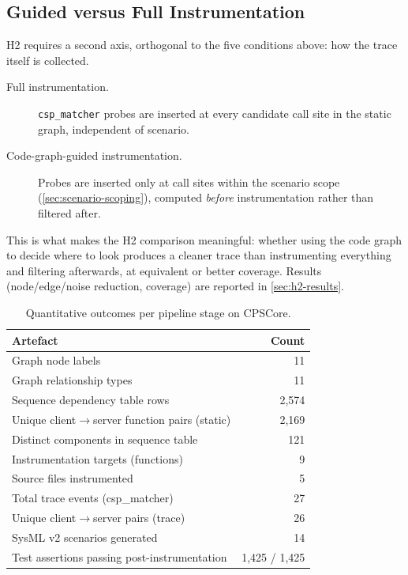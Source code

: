 \subsection{Guided versus Full Instrumentation}\label{sec:guided-vs-full}

H2 requires a second axis, orthogonal to the five conditions above: how
the trace itself is collected.

\begin{description}
  \item[Full instrumentation.] \texttt{csp\_matcher} probes are inserted
    at every candidate call site in the static graph, independent of
    scenario.
  \item[Code-graph-guided instrumentation.] Probes are inserted only at
    call sites within the scenario scope (\cref{sec:scenario-scoping}),
    computed \emph{before} instrumentation rather than filtered after.
\end{description}

This is what makes the H2 comparison meaningful: whether using the code
graph to decide where to look produces a cleaner trace than
instrumenting everything and filtering afterwards, at equivalent or
better coverage. Results (node/edge/noise reduction, coverage) are
reported in \cref{sec:h2-results}.

\begin{table}[htb]
\centering
\caption{Quantitative outcomes per pipeline stage on CPSCore.}
\label{tab:impl-summary}
\begin{tabular}{@{} l r @{}}
\toprule
\textbf{Artefact} & \textbf{Count} \\
\midrule
Graph node labels                            & 11 \\
Graph relationship types                     & 11 \\
Sequence dependency table rows               & 2,574 \\
Unique client$\to$server function pairs (static) & 2,169 \\
Distinct components in sequence table        & 121 \\
Instrumentation targets (functions)          & 9 \\
Source files instrumented                    & 5 \\
Total trace events (csp\_matcher)             & 27 \\
Unique client$\to$server pairs (trace)        & 26 \\
SysML v2 scenarios generated                 & 14 \\
Test assertions passing post-instrumentation & 1,425 / 1,425 \\
\bottomrule
\end{tabular}
\end{table}
